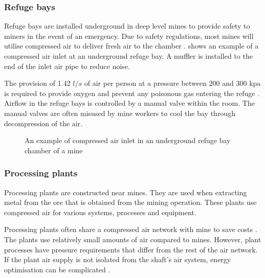 \subsubsection{Refuge bays}
Refuge bays are installed underground in deep level mines to provide safety to miners in the event of an emergency. Due to safety regulations, most mines will utilise compressed air to deliver fresh air to the chamber \cite{brake1999criteria}.  shows an example of a compressed air inlet at an underground refuge bay. A muffler is installed to the end of the inlet air pipe to reduce noise.
\par 
The provision of 1.42 $l/s$ of air per person at a pressure between 200 and 300 \gls{kpa} is required to provide oxygen and prevent any poisonous gas entering the refuge \cite{brake1999criteria}. Airflow in the refuge bays is controlled by a manual valve within the room. The manual valves are often misused by mine workers to cool the bay through decompression of the air. %
\begin{figure}[!htbp]
	\centering
	\caption{An example of compressed air inlet in an underground refuge bay chamber of a mine}
	\label{fig: Refuge Bay}
\end{figure}
\subsubsection{Processing plants}
Processing plants are constructed near mines. They are used when extracting metal from the ore that is obtained from the mining operation.  These plants use compressed air for various systems, processes and equipment. 
\par 
Processing plants often share a compressed air network with mine to save costs \cite{Marais2012PhD}. The plants use relatively small amounts of air compared to mines. However, plant processes have pressure requirements that differ from the rest of the air network. If the plant air supply is not isolated from the shaft's air system, energy optimisation can be complicated \cite{Kriel2014Masters}. 
